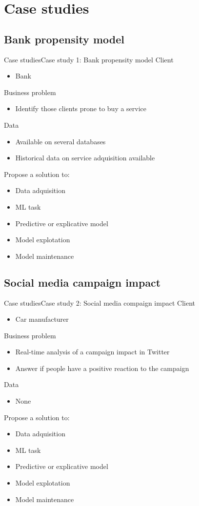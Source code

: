 \documentclass[10pt,compress]{beamer} %
\begin{document}
\section{Case studies}

\subsection{Bank propensity model}
\begin{frame}{Case studies}{Case study 1: Bank propensity model}
	Client
	\begin{itemize}
		\item Bank
	\end{itemize}
	Business problem
	\begin{itemize}
		\item Identify those clients prone to buy a service
	\end{itemize}
	Data
	\begin{itemize}
		\item Available on several databases
		\item Historical data on service adquisition available
	\end{itemize}
	Propose a solution to:
	\begin{itemize}
		\item Data adquisition
		\item ML task
		\item Predictive or explicative model
		\item Model explotation
		\item Model maintenance
	\end{itemize}
\end{frame}

\subsection{Social media campaign impact}
\begin{frame}{Case studies}{Case study 2: Social media compaign impact}
	Client
	\begin{itemize}
		\item Car manufacturer
	\end{itemize}
	Business problem
	\begin{itemize}
		\item Real-time analysis of a campaign impact in Twitter
		\item Answer if people have a positive reaction to the campaign
	\end{itemize}
	Data
	\begin{itemize}
		\item None
	\end{itemize}
	Propose a solution to:
	\begin{itemize}
		\item Data adquisition
		\item ML task
		\item Predictive or explicative model
		\item Model explotation
		\item Model maintenance
	\end{itemize}
\end{frame}
\end{document}
